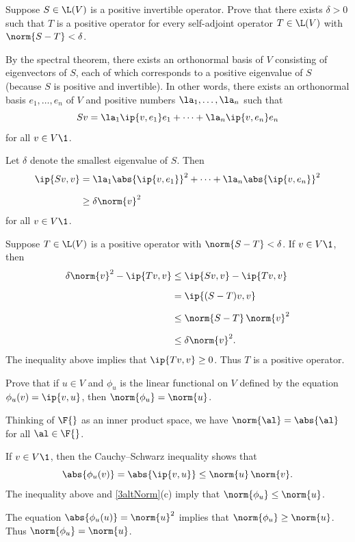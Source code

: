 \exercise
Suppose $S \in \L(V)$ is a positive invertible operator. Prove that there exists $\delta > 0$ such that $T$ is a positive operator for every self-adjoint operator $T \in \L(V)$ with $\norm{S-T} < \delta$.

\begin{Solution}
By the spectral theorem, there exists an orthonormal basis of $V$ consisting of eigenvectors of $S$, each of which corresponds to a positive eigenvalue of $S$ (because $S$ is positive and invertible). In other words, there exists an orthonormal basis
$e_1, \ldots, e_n$ of $V$ and positive numbers $\la_1, \ldots, \la_n$ such that
\[
Sv = \la_1 \ip{v, e_1}e_1 + \cdots + \la_n \ip{v, e_n} e_n
\]
for all $v \in V\1$.

Let $\delta$ denote the smallest eigenvalue of $S$. Then
\begin{align*}
\ip{Sv, v} &= \la_1 \abs{ \ip{v, e_1} }^2 + \cdots + \la_n \abs{ \ip{v, e_n} }^2 \\[6bp]
&\ge \delta \norm{v}^2
\end{align*}
for all $v \in V\1$.

Suppose $T \in \L(V)$ is a positive operator with $\norm{S-T} < \delta$. If $v \in V\1$, then
\begin{align*}
\delta \norm{v}^2 - \ip{Tv, v} &\le \ip{Sv, v} - \ip{Tv,v}\\[6bp]
&= \ip{ (S-T)v, v} \\[6bp]
&\le \norm{S-T} \, \norm{v}^2 \\[6bp]
&\le \delta \norm{v}^2.
\end{align*}
The inequality above implies that $\ip{Tv,v} \ge 0$. Thus $T$ is a positive operator.
\end{Solution}

\exercise
Prove that if $u \in V$ and $\phi_u$ is the linear functional on $V$ defined by the equation $\phi_u(v) = \ip{v, u}$, then
$\norm{\phi_u} = \norm{u}$.

\begin{Solution}
Thinking of $\F{}$ as an inner product space, we have $\norm{\al} = \abs{\al}$ for all $\al \in \F{}$.

If $v \in V\1$, then the Cauchy--Schwarz inequality shows that
\[
\abs{ \phi_u(v) } = \abs{ \ip{v, u} } \le \norm{u} \, \norm{v}.
\]
The inequality above and \ref{3altNorm}(c) imply that $\norm{\phi_u} \le \norm{u}$.

The equation $\abs{ \phi_u(u) } = \norm{u}^2$ implies that $\norm{\phi_u} \ge \norm{u}$. Thus $\norm{\phi_u} = \norm{u}$.
\end{Solution}

